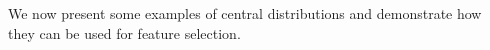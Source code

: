 We now present some examples of central distributions and demonstrate how they can be used for feature selection.
